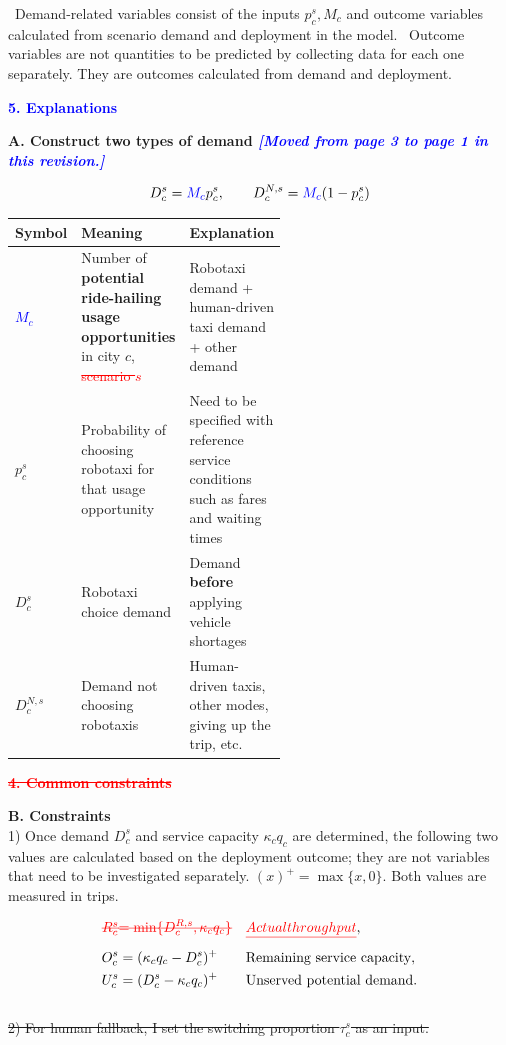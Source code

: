 \documentclass[10pt,a4paper]{article}
\newcommand{\hd}[1]{\par\vspace{8pt}\textbf{#1}\par\vspace{3pt}}
\newcommand{\note}{\textreferencemark\ }
\begin{document}
\note Demand-related variables consist of the inputs $p_c^s,M_c$ and outcome variables calculated from scenario demand and deployment in the model.
\note Outcome variables are not quantities to be predicted by collecting data for each one separately. They are outcomes calculated from demand and deployment.

\newpage
\hd{\textcolor{blue}{5. Explanations}}

\textbf{A. Construct two types of demand \textcolor{blue}{\small\textit{
[Moved from page 3 to page 1 in this revision.]
}}}

\[
D_c^s = \textcolor{blue}{M_c} p_c^s,\qquad 
D_c^{N,s}= \textcolor{blue}{M_c} (1-p_c^s)
\]

{\small
\begin{tabularx}{\linewidth}{@{}>{\raggedright\arraybackslash}p{0.12\linewidth}>{\raggedright\arraybackslash}p{0.42\linewidth}Y@{}}
\toprule
Symbol & Meaning & Explanation \\ \midrule
\textcolor{blue}{$M_c$} & Number of \textbf{potential ride-hailing usage opportunities} in city $c$, \textcolor{red}{\sout{scenario $s$}} & Robotaxi demand + human-driven taxi demand + other demand \\
$p_c^s$ & Probability of choosing robotaxi for that usage opportunity & Need to be specified with reference service conditions such as fares and waiting times \\
$D_c^s$ & Robotaxi choice demand & Demand \textbf{before} applying vehicle shortages \\
$D_c^{N,s}$ & Demand not choosing robotaxis & Human-driven taxis, other modes, giving up the trip, etc. \\
\bottomrule
\end{tabularx}
}

\hd{\textcolor{red}{\sout{4. Common constraints}}}

\textbf{B. Constraints}\\
1) Once demand $D_c^s$ and service capacity $\kappa_c q_c$ are determined, the following two values are calculated based on the deployment outcome; they are not variables that need to be investigated separately. $(x)^+=\max\{x,0\}$. Both values are measured in trips.

\[
\begin{aligned}
\textcolor{red}{\mbox{\sout{\(R_c^s\)}}}
&\textcolor{red}{\mbox{\sout{\(
  \displaystyle = \min\{D_c^{R,s},\kappa_c q_c\}
\)}}}
&&\textcolor{red}{\sout{Actual throughput}},\\
O_c^s&=(\kappa_c q_c-D_c^s)^+&&\text{Remaining service capacity},\\
U_c^s&=(D_c^s-\kappa_c q_c)^+&&\text{Unserved potential demand}.
\end{aligned}
\]\\
\begingroup
\color{red}
\sout{
2) For human fallback, I set the switching proportion $\tau_c^s$ as an input.
}
\end{document}
